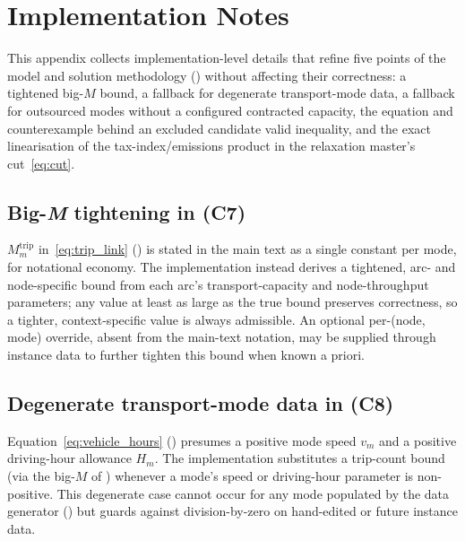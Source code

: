 
\section{Implementation Notes}
\label{app:impl_notes}

This appendix collects implementation-level details that refine five
points of the model and solution methodology
() without affecting their
correctness: a tightened big-$M$ bound, a fallback for degenerate
transport-mode data, a fallback for outsourced modes without a
configured contracted capacity, the equation and counterexample behind
an excluded candidate valid inequality, and the exact \MILP
linearisation of the tax-index/emissions product in the relaxation
master's cut~\eqref{eq:cut}.

\subsection{Big-\textit{M} tightening in (C7)}
\label{app:impl_notes:bigm}

$M^{\mathrm{trip}}_m$ in~\eqref{eq:trip_link} () is
stated in the main text as a single constant per mode, for notational
economy. The implementation instead derives a tightened, arc- and
node-specific bound from each arc's transport-capacity and
node-throughput parameters; any value at least as large as the true
bound preserves correctness, so a tighter, context-specific value is
always admissible. An optional per-(node, mode) override, absent from
the main-text notation, may be supplied through instance data to
further tighten this bound when known a priori.

\subsection{Degenerate transport-mode data in (C8)}
\label{app:impl_notes:degenerate}

Equation~\eqref{eq:vehicle_hours} () presumes a
positive mode speed $v_m$ and a positive driving-hour allowance
$H_m$. The implementation substitutes a trip-count bound (via the
big-$M$ of ) whenever a mode's speed or
driving-hour parameter is non-positive. This degenerate case cannot
occur for any mode populated by the data generator
() but guards against
division-by-zero on hand-edited or future instance data.

